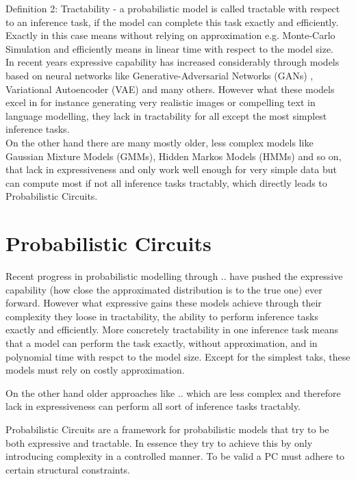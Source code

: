 Definition 2: Tractability - a probabilistic model is called tractable with respect to an inference task, if the model can complete this 
task exactly and efficiently. Exactly in this case means without relying on approximation e.g. Monte-Carlo Simulation and efficiently 
means in linear time with respect to the model size. \\

In recent years expressive capability has increased considerably through models based on neural networks like Generative-Adversarial
Networks (GANs) \cite{gan}, Variational Autoencoder (VAE) \cite{vae} and many others. However what these models excel in for instance generating 
very realistic images or compelling text in language modelling, they lack in tractability for all except the most simplest inference tasks. 
\cite{pc_intro} \\

On the other hand there are many mostly older, less complex models like Gaussian Mixture Models (GMMs), Hidden Markos Models (HMMs) and so on, 
that lack in expressiveness and only work well enough for very simple data but can compute most if not all inference tasks tractably, which directly
leads to Probabilistic Circuits.  


\section{Probabilistic Circuits}
\label{sec:pc}

Recent progress in probabilistic modelling through .. have pushed the expressive capability (how close the 
approximated distribution is to the true one) ever forward. However what expressive gains these models achieve through 
their complexity they loose in tractability, the ability to perform inference tasks exactly and efficiently.
More concretely tractability in one inference task means that a model can perform the task exactly, without approximation, and in polynomial time with respct to the model size.
Except for the simplest taks, these models must rely on costly approximation.

On the other hand older approaches like .. which are less complex and therefore lack in expressiveness can perform 
all sort of inference tasks tractably.

Probabilistic Circuits are a framework for probabilistic models that try to be both expressive and tractable. 
In essence they try to achieve this by only introducing complexity in a controlled manner. To be valid a PC must 
adhere to certain structural constraints. 

